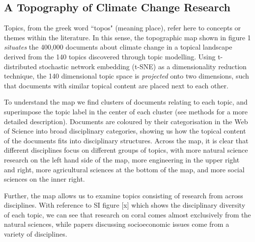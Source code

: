 \documentclass{article}
\begin{document}
\begin{linenumbers}
\subsection*{A Topography of Climate Change Research}

Topics, from the greek word ``topos" (meaning place), refer here to concepts or themes within the literature. In this sense, the topographic map shown in figure 1 \textit{situates} the 400,000 documents about climate change in a topical landscape derived from the 140 topics discovered through topic modelling. Using t-distributed stochastic network embedding \cite{vandermaaten2008} (t-SNE) as a dimensionality reduction technique, the 140 dimensional topic space is \textit{projected} onto two dimensions, such that documents with similar topical content are placed next to each other.

To understand the map we find clusters of documents relating to each topic, and superimpose the topic label in the center of each cluster (see methods for a more detailed description). Documents are coloured by their categorisation in the Web of Science into broad disciplinary categories, showing us how the topical content of the documents fits into disciplinary structures. Across the map, it is clear that different disciplines focus on different groups of topics, with more natural science research on the left hand side of the map, more engineering in the upper right and right, more agricultural sciences at the bottom of the map, and more social sciences on the inner right.

Further, the map allows us to examine topics consisting of research from across disciplines. With reference to SI figure [x] which shows the disciplinary diversity of each topic, we can see that research on coral comes almost exclusively from the natural sciences, while papers discussing socioeconomic issues come from a variety of disciplines. 



\end{linenumbers}
\end{document}
